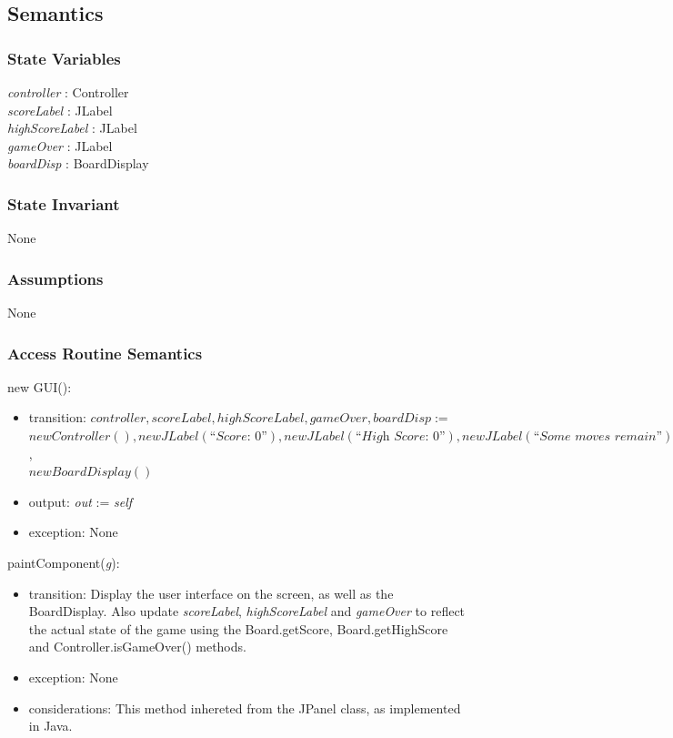 \documentclass{article}
\begin{document}
	\subsection*{Semantics}

		\subsubsection*{State Variables}
			\textit{controller} : Controller\\
			\textit{scoreLabel} : JLabel\\
			\textit{highScoreLabel} : JLabel\\
			\textit{gameOver} : JLabel\\
			\textit{boardDisp} : BoardDisplay

		\subsubsection*{State Invariant}
			None

		\subsubsection*{Assumptions}
			None

		\subsubsection*{Access Routine Semantics}
			\noindent new GUI():
			\begin{itemize}
				\item transition: $controller, scoreLabel, highScoreLabel, gameOver, boardDisp :=$\\ $new Controller(), new JLabel(\textit{``Score: 0''}), new JLabel(\textit{``High Score: 0''}), new JLabel(\textit{``Some moves remain''})$,\\ $new BoardDisplay()$
				\item output: \textit{out} := \textit{self}
				\item exception: None
			\end{itemize}

			\noindent paintComponent(\textit{g}):
			\begin{itemize}
				\item transition: Display the user interface on the screen, as well as the BoardDisplay. Also update \textit{scoreLabel}, \textit{highScoreLabel} and \textit{gameOver} to reflect the actual state of the game using the Board.getScore, Board.getHighScore and Controller.isGameOver() methods.
				\item exception: None
				\item considerations: This method inhereted from the JPanel class, as implemented in Java.
			\end{itemize}
\end{document}
